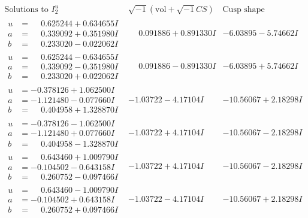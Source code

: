 \documentclass[1p]{elsarticle_modified}
\theoremstyle{definition}
\newcommand{\I}{\sqrt{-1}}
\begin{document}
$$\begin{array}{c|c|c}  
\text{Solutions to }I^u_{2}& \I (\text{vol} + \sqrt{-1}CS) & \text{Cusp shape}\\
 \hline 
\begin{aligned}
u &= \phantom{-}0.625244 + 0.634655 I \\
a &= \phantom{-}0.339092 + 0.351980 I \\
b &= \phantom{-}0.233020 - 0.022062 I\end{aligned}
 & \phantom{-}0.091886 + 0.891330 I & -6.03895 - 5.74662 I \\ \hline\begin{aligned}
u &= \phantom{-}0.625244 - 0.634655 I \\
a &= \phantom{-}0.339092 - 0.351980 I \\
b &= \phantom{-}0.233020 + 0.022062 I\end{aligned}
 & \phantom{-}0.091886 - 0.891330 I & -6.03895 + 5.74662 I \\ \hline\begin{aligned}
u &= -0.378126 + 1.062500 I \\
a &= -1.121480 - 0.077660 I \\
b &= \phantom{-}0.404958 + 1.328870 I\end{aligned}
 & -1.03722 - 4.17104 I & -10.56067 + 2.18298 I \\ \hline\begin{aligned}
u &= -0.378126 - 1.062500 I \\
a &= -1.121480 + 0.077660 I \\
b &= \phantom{-}0.404958 - 1.328870 I\end{aligned}
 & -1.03722 + 4.17104 I & -10.56067 - 2.18298 I \\ \hline\begin{aligned}
u &= \phantom{-}0.643460 + 1.009790 I \\
a &= -0.104502 - 0.643158 I \\
b &= \phantom{-}0.260752 - 0.097466 I\end{aligned}
 & -1.03722 + 4.17104 I & -10.56067 - 2.18298 I \\ \hline\begin{aligned}
u &= \phantom{-}0.643460 - 1.009790 I \\
a &= -0.104502 + 0.643158 I \\
b &= \phantom{-}0.260752 + 0.097466 I\end{aligned}
 & -1.03722 - 4.17104 I & -10.56067 + 2.18298 I \\ \hline\begin{aligned}

\end{aligned}
\end{array}$$
\end{document}
